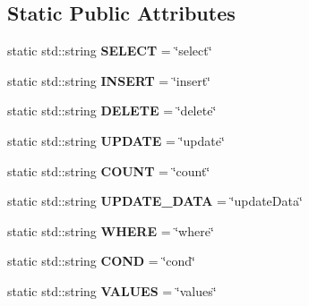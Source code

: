 \subsection*{Static Public Attributes}
\begin{DoxyCompactItemize}
\item 
\mbox{\label{class_droi_query_aa9b1efa1913aafaffd56ef3341b6fba4}} 
static std\+::string {\bfseries S\+E\+L\+E\+CT} = \char`\"{}select\char`\"{}
\item 
\mbox{\label{class_droi_query_acbf403b1e859512847e20cdedee5327b}} 
static std\+::string {\bfseries I\+N\+S\+E\+RT} = \char`\"{}insert\char`\"{}
\item 
\mbox{\label{class_droi_query_af686005b8a9e06be39b50564a5656e4b}} 
static std\+::string {\bfseries D\+E\+L\+E\+TE} = \char`\"{}delete\char`\"{}
\item 
\mbox{\label{class_droi_query_ab3e52ee42cacc1898d2dd67dcf44601a}} 
static std\+::string {\bfseries U\+P\+D\+A\+TE} = \char`\"{}update\char`\"{}
\item 
\mbox{\label{class_droi_query_a4aba57a581d8c2a808ee9198511dd1b1}} 
static std\+::string {\bfseries C\+O\+U\+NT} = \char`\"{}count\char`\"{}
\item 
\mbox{\label{class_droi_query_a5ec47818f9a738c6765c2bd7803373ca}} 
static std\+::string {\bfseries U\+P\+D\+A\+T\+E\+\_\+\+D\+A\+TA} = \char`\"{}update\+Data\char`\"{}
\item 
\mbox{\label{class_droi_query_a3da06d0419e09539fcc2621f1fe03e5b}} 
static std\+::string {\bfseries W\+H\+E\+RE} = \char`\"{}where\char`\"{}
\item 
\mbox{\label{class_droi_query_ade8e8d0507072be7d5e7398476cd4470}} 
static std\+::string {\bfseries C\+O\+ND} = \char`\"{}cond\char`\"{}
\item 
\mbox{\label{class_droi_query_a56b85fac52fed556f1a53f4cd8dfafc9}} 
static std\+::string {\bfseries V\+A\+L\+U\+ES} = \char`\"{}values\char`\"{}
\item 

\end{DoxyCompactItemize}
